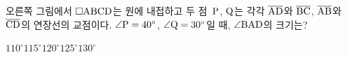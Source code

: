 \noindent\begin{minipage}[t]{0.58\linewidth}\vspace{0pt}\raggedright 오른쪽 그림에서 $\square\mathrm{ABCD}$는 원에 내접하고 두 점~$\mathrm{P}$, $\mathrm{Q}$는 각각 $\overline{\mathrm{AD}}$와 $\overline{\mathrm{BC}}$, $\overline{\mathrm{AB}}$와 $\overline{\mathrm{CD}}$의 연장선의 교점이다. $\angle\mathrm{P}=40^\circ$, $\angle\mathrm{Q}=30^\circ$일 때, $\angle\mathrm{BAD}$의 크기는?\end{minipage}\hfill\begin{minipage}[t]{0.4\linewidth}\vspace{0pt}\centering \resizebox{\ifdim\width>\linewidth\linewidth\else\width\fi}{!}{}\end{minipage}\par
\begin{choices32}{$110^\circ$}{$115^\circ$}{$120^\circ$}{$125^\circ$}{$130^\circ$}\end{choices32}
